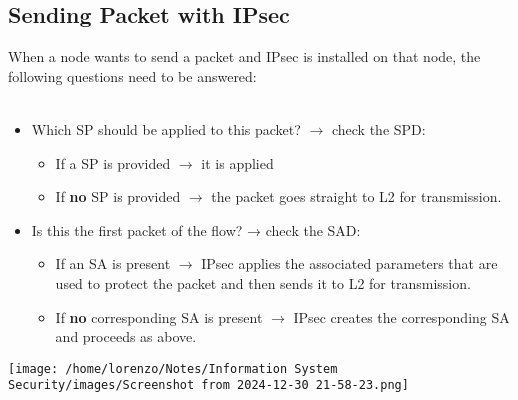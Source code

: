 \subsection{Sending Packet with IPsec}
When a node wants to send a packet and IPsec is installed on that node, the following questions need to be answered:
\\
\\
\begin{minipage}{0.6\textwidth}
    \begin{itemize}
        \item Which SP should be applied to this packet? \(\rightarrow \) check the SPD:
        \begin{itemize}
            \item If a SP is provided \(\rightarrow \) it is applied
            \item If \textbf{no} SP is provided \(\rightarrow \)  the packet goes straight to L2 for transmission.
        \end{itemize}
        \item Is this the first packet of the flow? → check the SAD:
        \begin{itemize}
            \item If an SA is present \(\rightarrow \) IPsec applies the associated parameters that are used to
            protect the packet and then sends it to L2 for transmission.
            \item If \textbf{no} corresponding SA is present \(\rightarrow \) IPsec creates the corresponding SA and proceeds as above.
        \end{itemize}
    \end{itemize} 
\end{minipage} 
\hspace{0.3cm}
\begin{minipage}{0.4\textwidth}
    \centering
    \texttt{[image: /home/lorenzo/Notes/Information System Security/images/Screenshot from 2024-12-30 21-58-23.png]}
\end{minipage}


